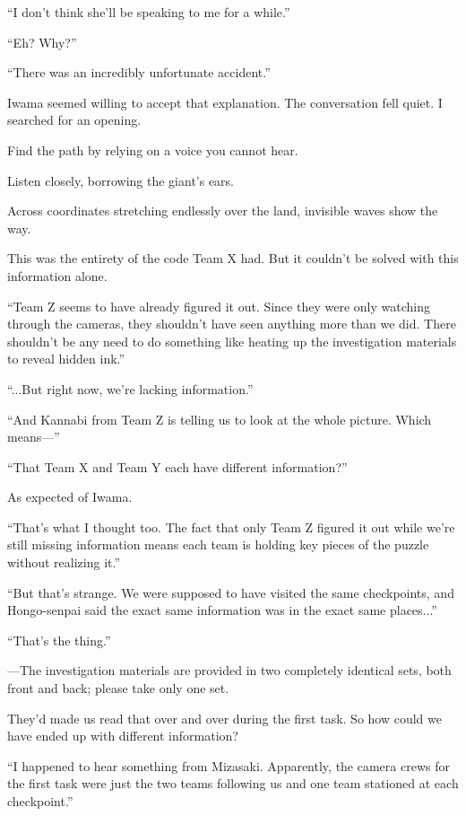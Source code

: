 \documentclass[
    a4paper,
    12pt,
    twoside,
    openany,
    UTF8,
    fontset=windows
]{ctexbook}
\begin{document}
``I don't think she'll be speaking to me for a while.''

``Eh? Why?''

``There was an incredibly unfortunate accident.''

Iwama seemed willing to accept that explanation. The conversation fell quiet. I searched for an opening.

\begin{center}
Find the path by relying on a voice you cannot hear.

Listen closely, borrowing the giant's ears.

Across coordinates stretching endlessly over the land, invisible waves show the way.
\end{center}

This was the entirety of the code Team X had. But it couldn't be solved with this information alone.

``Team Z seems to have already figured it out. Since they were only watching through the cameras, they shouldn't have seen anything more than we did. There shouldn't be any need to do something like heating up the investigation materials to reveal hidden ink.''

``...But right now, we're lacking information.''

``And Kannabi from Team Z is telling us to look at the whole picture. Which means---''

``That Team X and Team Y each have different information?''

As expected of Iwama.

``That's what I thought too. The fact that only Team Z figured it out while we're still missing information means each team is holding key pieces of the puzzle without realizing it.''

``But that's strange. We were supposed to have visited the same checkpoints, and Hongo-senpai said the exact same information was in the exact same places...''

``That's the thing.''

---The investigation materials are provided in two completely identical sets, both front and back; please take only one set.

They'd made us read that over and over during the first task. So how could we have ended up with different information?

``I happened to hear something from Mizasaki. Apparently, the camera crews for the first task were just the two teams following us and one team stationed at each checkpoint.''
\end{document}
